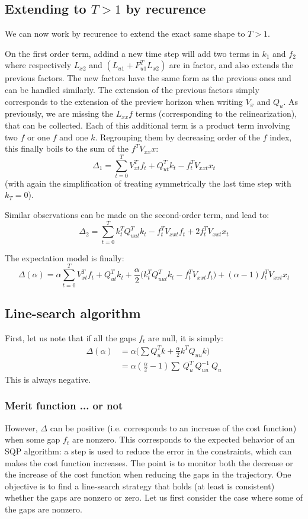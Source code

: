 \documentclass[10pt,a4paper]{article}
\begin{document}
\subsection{Extending to $T>1$ by recurence}
We can now work by recurence to extend the exact same shape to $T>1$.

On the first order term, addind a new time step will add two terms in $k_1$ and $f_2$ where respectively $L_{x2}$ and $(L_{u1} + F_{u1}^T L_{x2})$ are in factor, and also extends the previous factors.
The new factors have the same form as the previous ones and can be handled similarly.
The extension of the previous factors simply corresponds to the extension of the preview horizon when writing $V_x$ and $Q_u$.
As previously, we are missing the $L_{xx} f$ terms (corresponding to the relinearization), that can be collected.
Each of this additional term is a product term involving two $f$ or one $f$ and one $k$.
Regrouping them by decreasing order of the $f$ index, this finally boils to the sum of the $f^T V_{xx} x$:
$$\Delta_1 = \sum_{t=0}^T V_{xt}^T f_t + Q_{ut}^T k_t - f_t^T V_{xxt} x_t $$
(with again the simplification of treating symmetrically the last time step with $k_T=0$).

Similar observations can be made on the second-order term, and lead to:
$$\Delta_2 = \sum_{t=0}^T k_t^T Q_{uut}^T k_t-f_t^T V_{xxt} f_t +2 f_t^T V_{xxt} x_t $$


The expectation model is finally:
$$\Delta(\alpha) = \alpha \sum_{t=0}^T V_{xt}^T f_t + Q_{ut}^T k_t 
+ \frac{\alpha}{2} \Big( k_t^T Q_{uut}^T k_t-f_t^T V_{xxt} f_t \Big)
+ (\alpha-1) f_t^T V_{xxt} x_t$$


\subsection{Line-search algorithm}

First, let us note that if all the gaps $f_t$ are null, it is simply:
\begin{align*}
  \Delta(\alpha) &= \alpha \big( \sum Q_u^T k + \frac{\alpha}{2} k^T Q_{uu} k \big) \\
  &= \alpha(\frac{\alpha}{2} - 1) \sum  \ Q_u^T\ Q_{uu}^{-1} \ Q_u
\end{align*}
This is always negative.

\subsubsection{Merit function ... or not}
However, $\Delta$ can be positive (i.e. corresponds to an increase of the cost function) when some gap $f_t$ are nonzero.
This corresponds to the expected behavior of an SQP algorithm: a step is used to reduce the error in the constraints, which can makes the cost function increases.
The point is to monitor both the decrease or the increase of the cost function when reducing the gaps in the trajectory.
One objective is to find a line-search strategy that holds (at least is consistent) whether the gaps are nonzero or zero.
Let us first consider the case where some of the gaps are nonzero.
\end{document}
